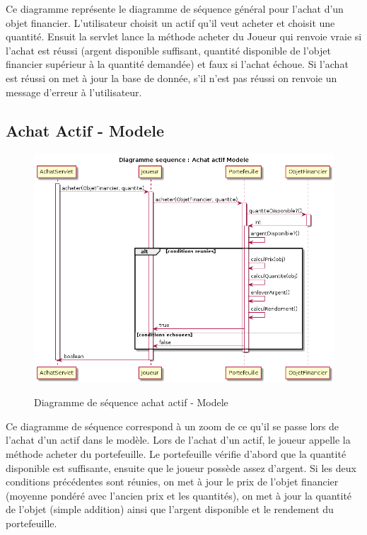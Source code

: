 Ce diagramme représente le diagramme de séquence général pour l'achat d'un objet financier. L'utilisateur choisit un actif qu'il veut acheter et choisit une quantité. Ensuit la servlet lance la méthode acheter du Joueur qui renvoie vraie si l'achat est réussi (argent disponible suffisant, quantité disponible de l'objet financier supérieur à la quantité demandée) et faux si l'achat échoue. Si l'achat est réussi on met à jour la base de donnée, s'il n'est pas réussi on renvoie un message d'erreur à l'utilisateur. 

\subsection{Achat Actif - Modele}
\begin{figure}[H]
  \center
  \includegraphics[scale=0.35]{../graph/DiagrammeSequenceAchatActifModele.png} \\
  \caption{Diagramme de séquence achat actif - Modele}
\end{figure}

Ce diagramme de séquence correspond à un zoom de ce qu'il se passe lors de l'achat d'un actif dans le modèle. Lors de l'achat d'un actif, le joueur appelle la méthode acheter du portefeuille. Le portefeuille vérifie d'abord que la quantité disponible est suffisante, ensuite que le joueur possède assez d'argent. Si les deux conditions précédentes sont réunies, on met à jour le prix de l'objet financier (moyenne pondéré avec l'ancien prix et les quantités), on met à jour la quantité de l'objet (simple addition) ainsi que l'argent disponible et le rendement du portefeuille. 

